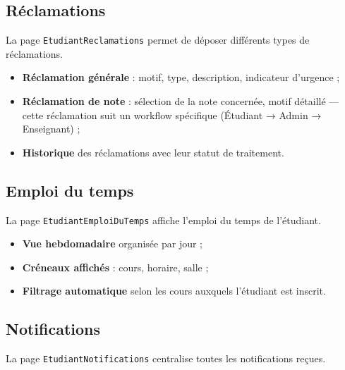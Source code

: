\subsection{Réclamations}

La page \texttt{EtudiantReclamations} permet de déposer différents types de réclamations.

\begin{itemize}[noitemsep]
    \item \textbf{Réclamation générale} : motif, type, description, indicateur d'urgence ;
    \item \textbf{Réclamation de note} : sélection de la note concernée, motif détaillé — cette réclamation suit un workflow spécifique (Étudiant → Admin → Enseignant) ;
    \item \textbf{Historique} des réclamations avec leur statut de traitement.
\end{itemize}

\subsection{Emploi du temps}

La page \texttt{EtudiantEmploiDuTemps} affiche l'emploi du temps de l'étudiant.

\begin{itemize}[noitemsep]
    \item \textbf{Vue hebdomadaire} organisée par jour ;
    \item \textbf{Créneaux affichés} : cours, horaire, salle ;
    \item \textbf{Filtrage automatique} selon les cours auxquels l'étudiant est inscrit.
\end{itemize}

\subsection{Notifications}

La page \texttt{EtudiantNotifications} centralise toutes les notifications reçues.

